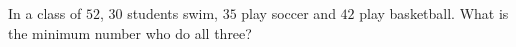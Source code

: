 In a class of $52$, $30$ students swim, $35$ play soccer and $42$ play basketball. What is the minimum number who do all three?

